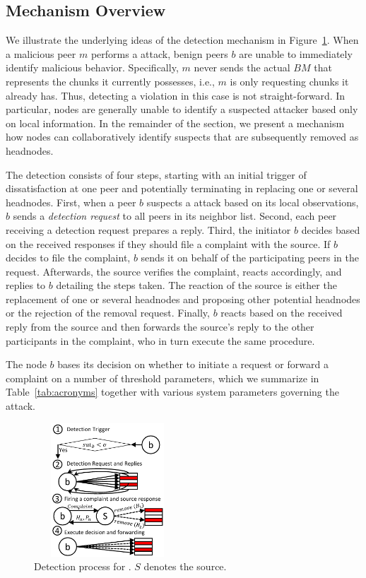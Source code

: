 \subsection{Mechanism Overview}
We illustrate the underlying ideas of the detection mechanism in Figure~\ref{detection-blocks}.
When a malicious peer $m$ performs a \drop attack, benign peers $b$ are unable to immediately identify malicious behavior.
Specifically, $m$ never sends the actual $BM$ that represents the chunks it currently possesses, i.e., $m$ is only requesting chunks it already has. 
Thus, detecting a violation in this case is not straight-forward. In particular, nodes are generally unable to identify a suspected attacker based only on local information.
In the remainder of the section, we present a mechanism how nodes can collaboratively identify suspects that are subsequently removed as headnodes.  


The detection consists of four steps, starting with an initial trigger of dissatisfaction at one peer and potentially terminating in replacing one or several headnodes. 
First, when a peer $b$ suspects a \drop attack based on its local observations, $b$ sends a \emph{detection request} to all peers in its neighbor list.
Second, each peer receiving a detection request prepares a reply. 
Third, the initiator $b$ decides based on the received responses if they should file a complaint with the source. 
If $b$ decides to file the complaint, $b$ sends it on behalf of the participating peers in the request. 
Afterwards, the source verifies the complaint, reacts accordingly, and replies to $b$ detailing the steps taken. 
The reaction of the source is either the replacement of one or several headnodes and proposing other potential headnodes or the rejection of the removal request.
Finally, $b$ reacts based on the received reply from the source and then forwards the source's reply to the other participants in the complaint, who in turn execute the same procedure.

The node $b$ bases its decision on whether to initiate a request or forward a complaint on a number of threshold parameters, which we summarize in Table~\ref{tab:acronyms} together with various system parameters governing the attack. 




\begin{figure}
 \centering
 \includegraphics[width=5.5cm,height=5cm]{./Figures/detection.pdf}
 
  \caption{Detection process for \drop. $S$ denotes the source.}
  \vspace{-4.5mm}
\label{detection-blocks} 
\end{figure}


